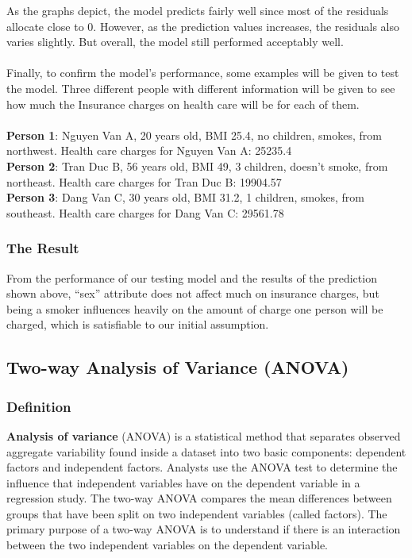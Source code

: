 \documentclass[a4paper]{article}
\begin{document}
As the graphs depict, the model predicts fairly well since most of the residuals allocate close to 0. However, as the prediction values increases, the residuals also varies slightly. But overall, the model still performed acceptably well. \\ \\
Finally, to confirm the model’s performance, some examples will be given to test the model. Three different people with different information will be given to see how much the Insurance charges on health care will be for each of them. \\ \\
\textbf{Person 1}: Nguyen Van A, 20 years old, BMI 25.4, no children, smokes, from northwest.
Health care charges for Nguyen Van A: 25235.4 \\
\textbf{Person 2}: Tran Duc B, 56 years old, BMI 49, 3 children, doesn’t smoke, from northeast.
Health care charges for Tran Duc B: 19904.57 \\
\textbf{Person 3}: Dang Van C, 30 years old, BMI 31.2, 1 children, smokes, from southeast.
Health care charges for Dang Van C: 29561.78
\subsubsection{The Result}
From the performance of our testing model and the results of the prediction shown above, “sex” attribute does not affect much on insurance charges, but being a smoker influences heavily on the amount of charge one person will be charged, which is satisfiable to our initial assumption. 
\newpage
\subsection{Two-way Analysis of Variance (ANOVA)}
\subsubsection{Definition}
\textbf{Analysis of variance} (ANOVA) is a statistical method that separates observed aggregate variability found inside a dataset into two basic components: dependent factors and independent factors. Analysts use the ANOVA test to determine the influence that independent variables have on the dependent variable in a regression study. The two-way ANOVA compares the mean differences between groups that have been split on two independent variables (called factors). The primary purpose of a two-way ANOVA is to understand if there is an interaction between the two independent variables on the dependent variable.
\end{document}
